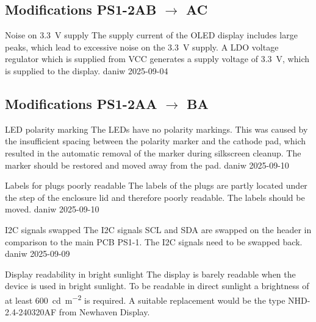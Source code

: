 \FloatBarrier

\subsection{Modifications PS1-2AB $\to$ AC}

\begin{ModTable}

\ModItemDone
{Noise on \qty{3.3}{\volt} supply}
{The supply current of the \ac{OLED} display includes large peaks, which lead to excessive noise on the \qty{3.3}{\volt} supply. }
{A \ac{LDO} voltage regulator which is supplied from VCC generates a supply voltage of \qty{3.3}{\volt}, which is supplied to the display. }
{daniw}
{2025-09-04}

\end{ModTable}

\FloatBarrier

\subsection{Modifications PS1-2AA $\to$ BA}

\begin{ModTable}

\ModItemDone
{LED polarity marking}
{The LEDs have no polarity markings. This was caused by the insufficient spacing between the polarity marker and the cathode pad, which resulted in the automatic removal of the marker during silkscreen cleanup. }
{The marker should be restored and moved away from the pad. }
{daniw}
{2025-09-10}

\ModItemDone
{Labels for plugs poorly readable}
{The labels of the plugs are partly located under the step of the enclosure lid and therefore poorly readable. }
{The labels should be moved. }
{daniw}
{2025-09-10}

\ModItemDone
{\acs{I2C} signals swapped}
{The \ac{I2C} signals SCL and SDA are swapped on the header in comparison to the main PCB PS1-1. }
{The \ac{I2C} signals need to be swapped back. }
{daniw}
{2025-09-09}

\ModItemOpen
{Display readability in bright sunlight}
{The display is barely readable when the device is used in bright sunlight. }
{To be readable in direct sunlight a brightness of at least \qty{600}{\candela\per\square\meter} is required. A suitable replacement would be the type NHD-2.4-240320AF from Newhaven Display. }
{}
{}

\end{ModTable}

